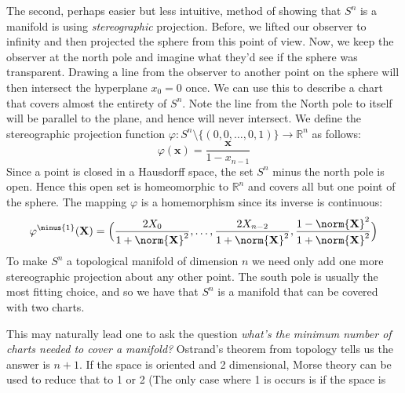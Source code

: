 \documentclass{article}                                                        %
\begin{document}
        \begin{example}
            The second, perhaps easier but less intuitive, method of showing
            that $S^{n}$ is a manifold is using \textit{stereographic}
            projection. Before, we lifted our observer to infinity and then
            projected the sphere from this point of view. Now, we keep the
            observer at the north pole and imagine what they'd see if the sphere
            was transparent. Drawing a line from the observer to another point
            on the sphere will then intersect the hyperplane $x_{0}=0$ once.
            We can use this to describe a chart that covers almost the entirety
            of $S^{n}$. Note the line from the North pole to itself will be
            parallel to the plane, and hence will never intersect. We define
            the stereographic projection function
            $\varphi:S^{n}\setminus\{(0,0,\dots,0,1)\}\rightarrow\mathbb{R}^{n}$
            as follows:
            \begin{equation}
                \varphi(\mathbf{x})=\frac{\mathbf{x}}{1-x_{n-1}}
            \end{equation}
            Since a point is closed in a Hausdorff space, the set $S^{n}$ minus
            the north pole is open. Hence this open set is homeomorphic to
            $\mathbb{R}^{n}$ and covers all but one point of the sphere. The
            mapping $\varphi$ is a homemorphism since its inverse is continuous:
            \begin{equation}
                \varphi^{\minus{1}}(\mathbf{X})=\Big(
                    \frac{2X_{0}}{1+\norm{\mathbf{X}}^{2}},\dots,
                    \frac{2X_{n-2}}{1+\norm{\mathbf{X}}^{2}},
                    \frac{1-\norm{\mathbf{X}}^{2}}{1+\norm{\mathbf{X}}^{2}}\Big)
            \end{equation}
            To make $S^{n}$ a topological manifold of dimension $n$ we need only
            add one more stereographic projection about any other point. The
            south pole is usually the most fitting choice, and so we have that
            $S^{n}$ is a manifold that can be covered with two charts.
        \end{example}
        This may naturally lead one to ask the question
        \textit{what's the minimum number of charts needed to cover a manifold?}
        Ostrand's theorem from topology tells us the answer is $n+1$. If the
        space is oriented and 2 dimensional, Morse theory can be used to reduce
        that to 1 or 2 (The only case where 1 is occurs is if the space is
\end{document}
